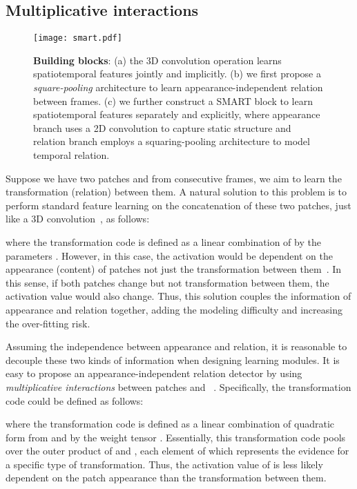 \documentclass[10pt,twocolumn,letterpaper]{article}
\begin{document}
\subsection{Multiplicative interactions}

\begin{figure*}
\texttt{[image: smart.pdf]}
\caption{{\bf Building blocks}: (a) the 3D convolution operation learns spatiotemporal features jointly and implicitly. (b) we first propose a {\em square-pooling} architecture to learn appearance-independent relation between frames. (c) we further construct a SMART block to learn spatiotemporal features separately and explicitly, where appearance branch uses a 2D convolution to capture static structure and relation branch employs a squaring-pooling architecture to model temporal relation.}
\label{fig:smart}
\vspace{-3mm}
\end{figure*}

Suppose we have two patches  and  from consecutive frames, we aim to learn the transformation (relation)  between them. A natural solution to this problem is to perform standard feature learning on the concatenation of these two patches, just like a 3D convolution~\cite{JiXYY13,TranBFTP15}, as follows:

where the transformation code  is defined as a linear combination of  by the parameters . However, in this case, the activation would be dependent on the appearance (content) of patches not just the transformation between them~\cite{Memisevic13}. In this sense, if both patches change but not transformation between them, the activation value would also change. Thus, this solution couples the information of appearance and relation together, adding the modeling difficulty and increasing the over-fitting risk.

Assuming the independence between appearance and relation, it is reasonable to decouple these two kinds of information when designing learning modules. It is easy to propose an appearance-independent relation detector by using {\em multiplicative interactions} between patches  and ~\cite{Memisevic13}. Specifically, the transformation code  could be defined as follows:

where the transformation code  is defined as a linear combination of quadratic form from  and  by the weight tensor . Essentially, this transformation code  pools over the outer product of  and , each element of which represents the evidence for a specific type of transformation. Thus, the activation value of  is less likely dependent on the patch appearance than the transformation between them.  
\end{document}
